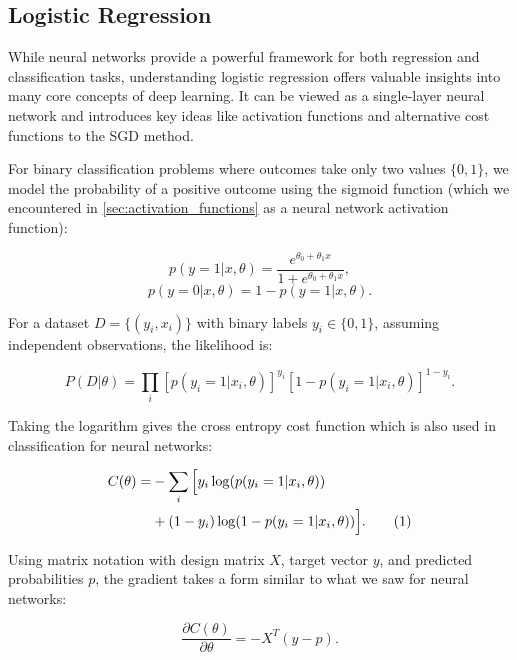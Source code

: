\documentclass[aps,pra,english,notitlepage,reprint,nofootinbib]{revtex4-1}  %
\newcommand\numberthis{\addtocounter{equation}{1}\tag{\theequation}}
\begin{document}
\subsection{Logistic Regression}
While neural networks provide a powerful framework for both regression and classification tasks, understanding logistic regression offers valuable insights into many core concepts of deep learning. It can be viewed as a single-layer neural network and introduces key ideas like activation functions and alternative cost functions to the SGD method.

For binary classification problems where outcomes take only two values \( \{0,1\} \), we model the probability of a positive outcome using the sigmoid function (which we encountered in \cref{sec:activation_functions} as a neural network activation function):

\begin{equation}
    p(y=1|x, \theta) = \frac{e^{\theta_0 + \theta_1x}}{1 + e^{\theta_0 + \theta_1x}},
\end{equation}
\begin{equation}
    p(y=0|x, \theta) = 1 - p(y=1|x, \theta).
\end{equation}

For a dataset \( D = \{(y_i,x_i)\} \) with binary labels \( y_i \in \{0,1\} \), assuming independent observations, the likelihood is:

\begin{equation}
    P(D|\theta) = \prod_i[p(y_i=1|x_i,\theta)]^{y_i}[1-p(y_i=1|x_i,\theta)]^{1-y_i}.
\end{equation}

Taking the logarithm gives the cross entropy cost function which is also used in classification for neural networks:

\begin{align*}
    C(\theta)
    = &-\sum_i\Big[y_i\log(p(y_i=1|x_i,\theta)) \\
    & + (1-y_i)\log(1-p(y_i=1|x_i,\theta))\Big]. \numberthis \label{logistic_cost}
\end{align*}

Using matrix notation with design matrix \( X \), target vector \( y \), and predicted probabilities \( p \), the gradient takes a form similar to what we saw for neural networks:

\begin{equation}
    \frac{\partial C(\theta)}{\partial \theta} = -X^T(y-p).
\end{equation}
\end{document}
